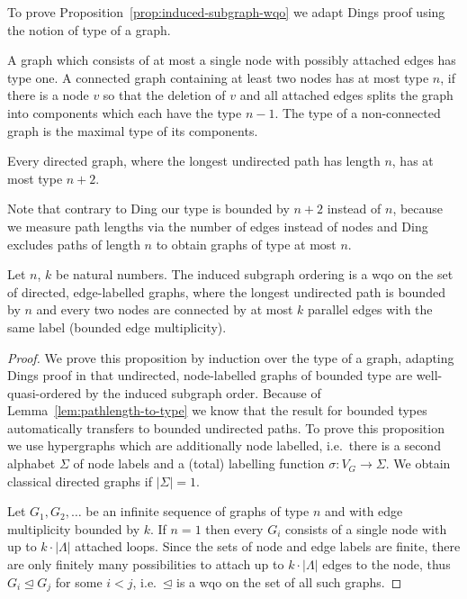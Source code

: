 \documentclass{llncs}
\newcommand{\indsubOrder}{\unlhd}
\begin{document}
{To prove Proposition~\ref{prop:induced-subgraph-wqo} we adapt Dings proof
using the notion of type of a graph.

\begin{definition}
  A graph which consists of at most a single node with possibly
  attached edges has type one. A connected graph containing at least
  two nodes has at most type $n$, if there is a node $v$ so that the
  deletion of $v$ and all attached edges splits the graph into
  components which each have the type $n-1$. The type of a
  non-connected graph is the maximal type of its components.
\end{definition}

\begin{lemma}\label{lem:pathlength-to-type}
  Every directed graph, where the longest undirected path has length $n$, has at
  most type $n+2$.
\end{lemma}

Note that contrary to Ding our type is bounded by $n+2$ instead of
$n$, because we measure path lengths via the number of edges instead
of nodes and Ding excludes paths of length $n$ to obtain graphs of
type at most $n$.

\begin{proposition}\label{prop:induced-subgraph-wqo}
  Let $n$, $k$ be natural numbers. The induced subgraph ordering is a
  wqo on the set of directed, edge-labelled graphs, where the longest undirected
  path is bounded by $n$ and every two nodes are connected by at most
  $k$ parallel edges with the same label (bounded edge multiplicity).
\end{proposition}

\begin{proof}
We prove this proposition by induction over the type of a graph, adapting 
Dings proof in \cite{ding:subgraphs-wqo} that undirected, node-labelled graphs 
of bounded type are well-quasi-ordered by the induced subgraph order. Because 
of Lemma~\ref{lem:pathlength-to-type} we know that the result for bounded 
types automatically transfers to bounded undirected paths.
To prove this proposition we use hypergraphs which are additionally node 
labelled, i.e.~there is a second alphabet $\Sigma$ of node labels and a 
(total) labelling function $\sigma : V_G \to \Sigma$. We obtain classical 
directed graphs if $|\Sigma| = 1$.

Let $G_1, G_2, \ldots$ be an infinite sequence of graphs of type $n$
and with edge multiplicity bounded by $k$. If $n=1$ then every $G_i$
consists of a single node with up to $k \cdot |\Lambda|$ attached 
loops. Since the sets of node and edge labels are finite, there are only 
finitely many possibilities to attach up to $k \cdot |\Lambda|$ edges to the 
node, thus $G_i \indsubOrder G_j$ for some $i < j$, i.e.~$\indsubOrder$ is a
wqo on the set of all such graphs.


\end{proof}}
\end{document}
